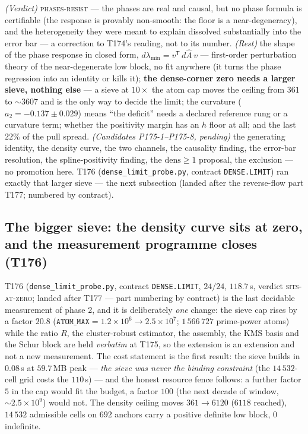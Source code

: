\documentclass[11pt,a4paper]{article}
\begin{document}
\begin{keybox}
\emph{(Verdict)} \textsc{phases-resist} --- the phases are real and
causal, but no phase formula is certifiable (the response is provably
non-smooth: the floor is a near-degeneracy), and the heterogeneity
they were meant to explain dissolved substantially into the error bar
--- a correction to T174's reading, not to its number. \emph{(Rest)}
the shape of the phase response in closed form,
$d\lambda_{\min}=v^{\mathsf T}\,d\hat A\,v$ --- first-order
perturbation theory of the near-degenerate low block, no fit anywhere
(it turns the phase regression into an identity or kills it);
\textbf{the dense-corner zero needs a larger sieve, nothing else} ---
a sieve at $10\times$ the atom cap moves the ceiling from $361$ to
${\sim}3607$ and is the only way to decide the limit; the curvature
($a_2=-0.137\pm0.029$) means ``the deficit'' needs a declared
reference rung or a curvature term; whether the positivity margin has
an $h$ floor at all; and the last $22\%$ of the pull spread.
\emph{(Candidates P175-1--P175-8, pending)} the generating identity,
the density curve, the two channels, the causality finding, the
error-bar resolution, the spline-positivity finding, the
$\mathrm{dens}\ge1$ proposal, the exclusion --- no promotion here.
T176 (\texttt{dense\_limit\_probe.py}, contract \texttt{DENSE.LIMIT})
ran exactly that larger sieve --- the next subsection (landed after
the reverse-flow part T177; numbered by contract).
\end{keybox}

\subsection{The bigger sieve: the density curve sits at zero, and the
measurement programme closes (T176)}\label{sec:t176}
T176 (\texttt{dense\_limit\_probe.py}, contract \texttt{DENSE.LIMIT},
$24/24$, $118.7$\,s, verdict \textsc{sits-at-zero}; landed after T177
--- part numbering by contract) is the last decidable measurement of
phase 2, and it is deliberately \emph{one} change: the sieve cap rises
by a factor $20.8$ ($\mathtt{ATOM\_MAX}=1.2\times10^{6}\to
2.5\times10^{7}$; $1\,566\,727$ prime-power atoms) while the ratio
$R$, the cluster-robust estimator, the assembly, the KMS basis and the
Schur block are held \emph{verbatim} at T175, so the extension is an
extension and not a new measurement. The cost statement is the first
result: the sieve builds in $0.08$\,s at $59.7$\,MB peak --- \emph{the
sieve was never the binding constraint} (the $14\,532$-cell grid costs
the $110$\,s) --- and the honest resource fence follows: a further
factor $5$ in the cap would fit the budget, a factor $100$ (the next
decade of window, ${\sim}2.5\times10^{9}$) would not. The density
ceiling moves $361\to6120$ ($6118$ reached), $14\,532$ admissible
cells on $692$ anchors carry a positive definite low block, $0$
indefinite.
\end{document}
